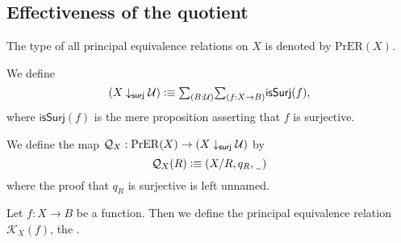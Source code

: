 \subsection{Effectiveness of the quotient}

\begin{defn}
The type of all principal equivalence relations on $X$ is denoted by $\mathrm{PrER}(X)$. 
\end{defn}

\begin{defn}
We define
\begin{equation*}
(X\downarrow_{\mathsf{surj}}\UU)\defeq\sm{B:\UU}{f:X\to B}\mathsf{isSurj}(f),
\end{equation*}
where $\mathsf{isSurj}(f)$ is the mere proposition asserting that $f$ is surjective.
\end{defn}

\begin{defn}\label{defn:Q}
We define the map $\mathcal{Q}_X: \mathrm{PrER}(X)\to (X\downarrow_{\mathsf{surj}}\mathcal{U})$
by
\begin{equation*}
\mathcal{Q}_X(R)\vcentcolon\equiv {\mathopen{}(X/R,q_R,\mathord{\hspace{1pt}\underline{\hspace{1ex}}\hspace{1pt}})\mathclose{}}
\end{equation*}
where the proof that $q_R$ is surjective is left unnamed.
\end{defn}

\begin{defn}
Let $f:X\to B$ be a function. Then we define the principal equivalence relation $\mathcal{K}_X(f)$, the . 
\end{defn}

